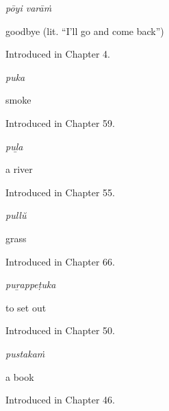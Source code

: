 \noindent\begin{minipage}[t]{\linewidth}
\raggedright
\textbf{ }\enspace\emph{pōyi varāṁ}\par
\small goodbye (lit. \textquotedblleft{}I'll go and come back\textquotedblright{})\par
\footnotesize Introduced in Chapter 4.
\end{minipage}\par\medskip

\noindent\begin{minipage}[t]{\linewidth}
\raggedright
\textbf{}\enspace\emph{puka}\par
\small smoke\par
\footnotesize Introduced in Chapter 59.
\end{minipage}\par\medskip

\noindent\begin{minipage}[t]{\linewidth}
\raggedright
\textbf{}\enspace\emph{puḻa}\par
\small a river\par
\footnotesize Introduced in Chapter 55.
\end{minipage}\par\medskip

\noindent\begin{minipage}[t]{\linewidth}
\raggedright
\textbf{}\enspace\emph{pullŭ}\par
\small grass\par
\footnotesize Introduced in Chapter 66.
\end{minipage}\par\medskip

\noindent\begin{minipage}[t]{\linewidth}
\raggedright
\textbf{}\enspace\emph{puṟappeṭuka}\par
\small to set out\par
\footnotesize Introduced in Chapter 50.
\end{minipage}\par\medskip

\noindent\begin{minipage}[t]{\linewidth}
\raggedright
\textbf{}\enspace\emph{pustakaṁ}\par
\small a book\par
\footnotesize Introduced in Chapter 46.
\end{minipage}\par\medskip

